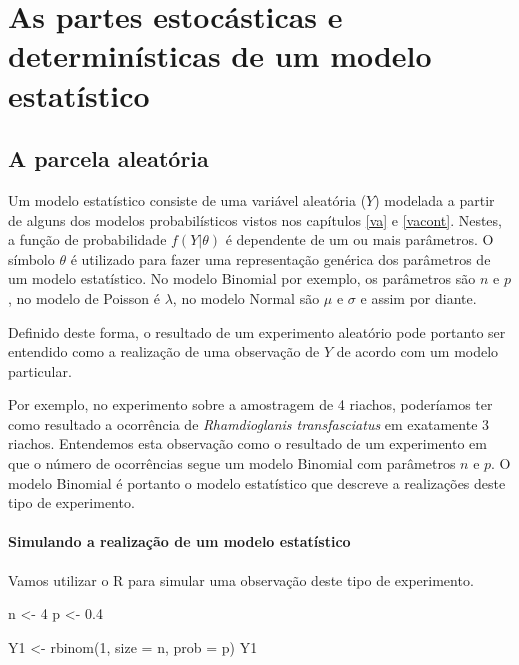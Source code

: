 \documentclass[
]{book}
\newenvironment{Shaded}{\begin{snugshade}}{\end{snugshade}}
\newcommand{\AttributeTok}[1]{\textcolor[rgb]{0.77,0.63,0.00}{#1}}
\newcommand{\DecValTok}[1]{\textcolor[rgb]{0.00,0.00,0.81}{#1}}
\newcommand{\FloatTok}[1]{\textcolor[rgb]{0.00,0.00,0.81}{#1}}
\newcommand{\FunctionTok}[1]{\textcolor[rgb]{0.00,0.00,0.00}{#1}}
\newcommand{\NormalTok}[1]{#1}
\newcommand{\OtherTok}[1]{\textcolor[rgb]{0.56,0.35,0.01}{#1}}
\begin{document}
\hypertarget{modelstat}{%
\chapter{As partes estocásticas e determinísticas de um modelo estatístico}\label{modelstat}}

\hypertarget{a-parcela-aleatuxf3ria}{%
\section{A parcela aleatória}\label{a-parcela-aleatuxf3ria}}

Um modelo estatístico consiste de uma variável aleatória (\(Y\)) modelada a partir de alguns dos modelos probabilísticos vistos nos capítulos \ref{va} e \ref{vacont}. Nestes, a função de probabilidade \(f(Y|\theta)\) é dependente de um ou mais parâmetros. O símbolo \(\theta\) é utilizado para fazer uma representação genérica dos parâmetros de um modelo estatístico. No modelo Binomial por exemplo, os parâmetros são \(n\) e \(p\), no modelo de Poisson é \(\lambda\), no modelo Normal são \(\mu\) e \(\sigma\) e assim por diante.

Definido deste forma, o resultado de um experimento aleatório pode portanto ser entendido como a realização de uma observação de \(Y\) de acordo com um modelo particular.

Por exemplo, no experimento sobre a amostragem de 4 riachos, poderíamos ter como resultado a ocorrência de \emph{Rhamdioglanis transfasciatus} em exatamente \(3\) riachos. Entendemos esta observação como o resultado de um experimento em que o número de ocorrências segue um modelo Binomial com parâmetros \(n\) e \(p\). O modelo Binomial é portanto o modelo estatístico que descreve a realizações deste tipo de experimento.

\hypertarget{simulando-a-realizauxe7uxe3o-de-um-modelo-estatuxedstico}{%
\subsubsection*{Simulando a realização de um modelo estatístico}\label{simulando-a-realizauxe7uxe3o-de-um-modelo-estatuxedstico}}

Vamos utilizar o R para simular uma observação deste tipo de experimento.

\begin{Shaded}
\begin{Highlighting}[]
\NormalTok{n }\OtherTok{\textless{}{-}} \DecValTok{4}
\NormalTok{p }\OtherTok{\textless{}{-}} \FloatTok{0.4}

\NormalTok{Y1 }\OtherTok{\textless{}{-}} \FunctionTok{rbinom}\NormalTok{(}\DecValTok{1}\NormalTok{, }\AttributeTok{size =}\NormalTok{ n, }\AttributeTok{prob =}\NormalTok{ p)}
\NormalTok{Y1}
\end{Highlighting}
\end{Shaded}
\end{document}
